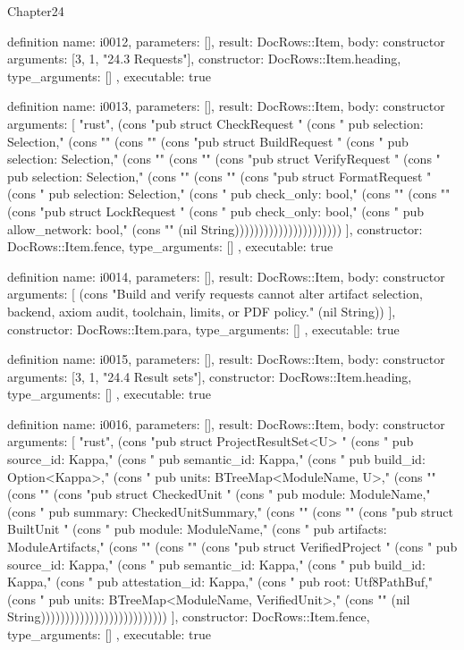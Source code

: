 \begin{lexlean}{Chapter24}
\begin{semanticmodule}
definition{
  name: i0012,
  parameters: [],
  result: DocRows::Item,
  body: constructor{
    arguments: [3, 1, "24.3 Requests"],
    constructor: DocRows::Item.heading,
    type_arguments: []
  },
  executable: true
}

definition{
  name: i0013,
  parameters: [],
  result: DocRows::Item,
  body: constructor{
    arguments: [
      "rust",
      (cons "pub struct CheckRequest {" (cons "    pub selection: Selection," (cons "}" (cons "" (cons "pub struct BuildRequest {" (cons "    pub selection: Selection," (cons "}" (cons "" (cons "pub struct VerifyRequest {" (cons "    pub selection: Selection," (cons "}" (cons "" (cons "pub struct FormatRequest {" (cons "    pub selection: Selection," (cons "    pub check_only: bool," (cons "}" (cons "" (cons "pub struct LockRequest {" (cons "    pub check_only: bool," (cons "    pub allow_network: bool," (cons "}" (nil String))))))))))))))))))))))
    ],
    constructor: DocRows::Item.fence,
    type_arguments: []
  },
  executable: true
}

definition{
  name: i0014,
  parameters: [],
  result: DocRows::Item,
  body: constructor{
    arguments: [
      (cons "Build and verify requests cannot alter artifact selection, backend, axiom audit, toolchain, limits, or PDF policy." (nil String))
    ],
    constructor: DocRows::Item.para,
    type_arguments: []
  },
  executable: true
}

definition{
  name: i0015,
  parameters: [],
  result: DocRows::Item,
  body: constructor{
    arguments: [3, 1, "24.4 Result sets"],
    constructor: DocRows::Item.heading,
    type_arguments: []
  },
  executable: true
}

definition{
  name: i0016,
  parameters: [],
  result: DocRows::Item,
  body: constructor{
    arguments: [
      "rust",
      (cons "pub struct ProjectResultSet<U> {" (cons "    pub source_id: Kappa," (cons "    pub semantic_id: Kappa," (cons "    pub build_id: Option<Kappa>," (cons "    pub units: BTreeMap<ModuleName, U>," (cons "}" (cons "" (cons "pub struct CheckedUnit {" (cons "    pub module: ModuleName," (cons "    pub summary: CheckedUnitSummary," (cons "}" (cons "" (cons "pub struct BuiltUnit {" (cons "    pub module: ModuleName," (cons "    pub artifacts: ModuleArtifacts," (cons "}" (cons "" (cons "pub struct VerifiedProject {" (cons "    pub source_id: Kappa," (cons "    pub semantic_id: Kappa," (cons "    pub build_id: Kappa," (cons "    pub attestation_id: Kappa," (cons "    pub root: Utf8PathBuf," (cons "    pub units: BTreeMap<ModuleName, VerifiedUnit>," (cons "}" (nil String))))))))))))))))))))))))))
    ],
    constructor: DocRows::Item.fence,
    type_arguments: []
  },
  executable: true
}


\end{semanticmodule}
\end{lexlean}
